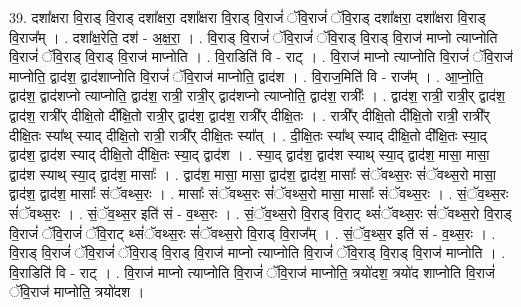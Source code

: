 \documentclass[17pt]{extarticle}
\begin{document}
39. दशा᳚क्षरा वि॒राड् वि॒राड् दशा᳚क्षरा॒ दशा᳚क्षरा वि॒राड् वि॒राजं॑ ॅवि॒राजं॑ ॅवि॒राड् दशा᳚क्षरा॒ दशा᳚क्षरा वि॒राड् वि॒राज᳚म् । . दशा᳚क्ष॒रेति॒ दश॑ - अ॒क्ष॒रा॒ । . वि॒राड् वि॒राजं॑ ॅवि॒राजं॑ ॅवि॒राड् वि॒राड् वि॒राज॑ माप्नो त्याप्नोति वि॒राजं॑ ॅवि॒राड् वि॒राड् वि॒राज॑ माप्नोति । . वि॒राडिति॑ वि - राट् । . वि॒राज॑ माप्नो त्याप्नोति वि॒राजं॑ ॅवि॒राज॑ माप्नोति॒ द्वाद॑श॒ द्वाद॑शाप्नोति वि॒राजं॑ ॅवि॒राज॑ माप्नोति॒ द्वाद॑श । . वि॒राज॒मिति॑ वि - राज᳚म् । . आ॒प्नो॒ति॒ द्वाद॑श॒ द्वाद॑शप्नो त्याप्नोति॒ द्वाद॑श॒ रात्री॒ रात्री॒र् द्वाद॑शप्नो त्याप्नोति॒ द्वाद॑श॒ रात्रीः᳚ । . द्वाद॑श॒ रात्री॒ रात्री॒र् द्वाद॑श॒ द्वाद॑श॒ रात्री᳚र् दीक्षि॒तो दी᳚क्षि॒तो रात्री॒र् द्वाद॑श॒ द्वाद॑श॒ रात्री᳚र् दीक्षि॒तः । . रात्री᳚र् दीक्षि॒तो दी᳚क्षि॒तो रात्री॒ रात्री᳚र् दीक्षि॒तः स्या᳚थ् स्याद् दीक्षि॒तो रात्री॒ रात्री᳚र् दीक्षि॒तः स्या᳚त् । . दी॒क्षि॒तः स्या᳚थ् स्याद् दीक्षि॒तो दी᳚क्षि॒तः स्या॒द् द्वाद॑श॒ द्वाद॑श स्याद् दीक्षि॒तो दी᳚क्षि॒तः स्या॒द् द्वाद॑श । . स्या॒द् द्वाद॑श॒ द्वाद॑श स्याथ् स्या॒द् द्वाद॑श॒ मासा॒ मासा॒ द्वाद॑श स्याथ् स्या॒द् द्वाद॑श॒ मासाः᳚ । . द्वाद॑श॒ मासा॒ मासा॒ द्वाद॑श॒ द्वाद॑श॒ मासाः᳚ संॅवथ्स॒रः सं॑ॅवथ्स॒रो मासा॒ द्वाद॑श॒ द्वाद॑श॒ मासाः᳚ संॅवथ्स॒रः । . मासाः᳚ संॅवथ्स॒रः सं॑ॅवथ्स॒रो मासा॒ मासाः᳚ संॅवथ्स॒रः । . सं॒ॅव॒थ्स॒रः सं॑ॅवथ्स॒रः । . सं॒ॅव॒थ्स॒र इति॑ सं - व॒थ्स॒रः । . सं॒ॅव॒थ्स॒रो वि॒राड् वि॒राट् थ्सं॑ॅवथ्स॒रः सं॑ॅवथ्स॒रो वि॒राड् वि॒राजं॑ ॅवि॒राजं॑ ॅवि॒राट् 
थ्सं॑ॅवथ्स॒रः सं॑ॅवथ्स॒रो वि॒राड् वि॒राज᳚म् । . सं॒ॅव॒थ्स॒र इति॑ सं - व॒थ्स॒रः । . वि॒राड् वि॒राजं॑ ॅवि॒राजं॑ ॅवि॒राड् वि॒राड् वि॒राज॑ माप्नो त्याप्नोति वि॒राजं॑ ॅवि॒राड् वि॒राड् वि॒राज॑ माप्नोति । . वि॒राडिति॑ वि - राट् । . वि॒राज॑ माप्नो त्याप्नोति वि॒राजं॑ ॅवि॒राज॑ माप्नोति॒ त्रयो॑दश॒ त्रयो॑द शाप्नोति वि॒राजं॑ ॅवि॒राज॑ माप्नोति॒ त्रयो॑दश । \newline
\end{document}
